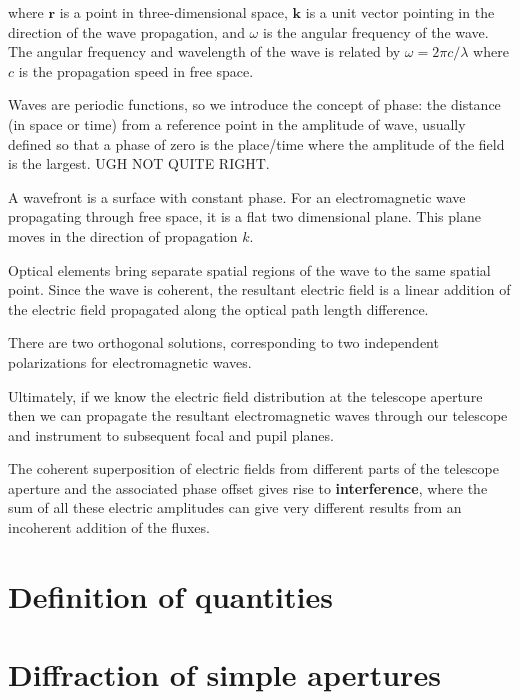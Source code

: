 \documentclass[letterpaper]{ar-1col}
\begin{document}
where $\mathbf{r}$ is a point in three-dimensional space, $\mathbf{k}$ is a unit vector pointing in the direction of the wave propagation, and $\omega$ is the angular frequency of the wave.
%
The angular frequency and wavelength of the wave is related by $\omega = 2\pi c/\lambda$ where $c$ is the propagation speed in free space.
%

Waves are periodic functions, so we introduce the concept of phase: the distance (in space or time) from a reference point in the amplitude of wave, usually defined so that a phase of zero is the place/time where the amplitude of the field is the largest. UGH NOT QUITE RIGHT. 

A wavefront is a surface with constant phase.
%
For an electromagnetic wave propagating through free space, it is a flat two dimensional plane.
%
This plane moves in the direction of propagation $k$.

Optical elements bring separate spatial regions of the wave to the same spatial point.
%
Since the wave is coherent, the resultant electric field is a linear addition of the electric field propagated along the optical path length difference.
%

There are two orthogonal solutions, corresponding to two independent polarizations for electromagnetic waves.

Ultimately, if we know the electric field distribution at the telescope aperture then we can propagate the resultant electromagnetic waves through our telescope and instrument to subsequent focal and pupil planes.

The coherent superposition of electric fields from different parts of the telescope aperture and the associated phase offset gives rise to \textbf{interference}, where the sum of all these electric amplitudes can give very different results from an incoherent addition of the fluxes.

\section{Definition of quantities}

\section{Diffraction of simple apertures}
\end{document}
